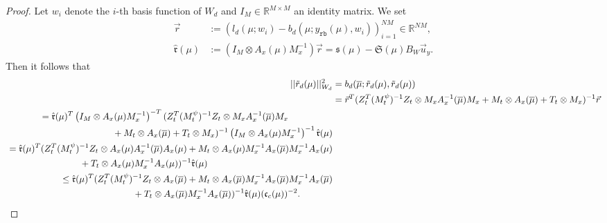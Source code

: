 \documentclass{article}
\theoremstyle{plain}
\theoremstyle{definition}
\theoremstyle{remark}
\newcommand{\RR}{\mathbb{R}}
\begin{document}
\begin{proof}
Let $w_i$ denote the $i$-th basis function of $W_d$ and $I_{M} \in \RR^{M \times M}$ an identity matrix. We set 
\begin{align}
    \Vec{r} &:= \left(l_d(\mu; w_{i}) - b_d(\mu; y_{\texttt{rb}}(\mu), w_{i})\right)_{i = 1}^{NM} \in \RR^{NM},\\
    \hat{\mathfrak{r}}(\mu) &:= \left(I_{M} \otimes A_{x}(\mu)M_{x}^{-1}\right)\Vec{r} = \mathfrak{s}(\mu) - \mathfrak{S}(\mu) B_W \Vec{u}_y.\label{eq:residual_vec_to_assemble}
\end{align}
Then it follows that
\begin{align}
    \vert \vert \Tilde{r}_{d}(\mu) \vert \vert^{2}_{W_{d}} &= b_d(\overline{\mu}; \Tilde{r}_{d}(\mu), \Tilde{r}_{d}(\mu))\\
    &= \Vec{r}^T (Z_t^T (M_t^\psi)^{-1} Z_t \otimes M_{x}A_{x}^{-1}(\overline{\mu})M_{x} + M_{t} \otimes A_{x}(\overline{\mu}) + T_t\otimes M_x)^{-1}\Vec{r}\\
\begin{split}
    &= \hat{\mathfrak{r}}(\mu)^T \left(I_{M} \otimes A_{x}(\mu)M_{x}^{-1}\right)^{- T} (Z_t^T (M_t^\psi)^{-1} Z_t \otimes M_{x}A_{x}^{-1}(\overline{\mu})M_{x} \\&\qquad\qquad\qquad\qquad+ M_{t} \otimes A_{x}(\overline{\mu}) + T_t\otimes M_x)^{-1} \left(I_{M} \otimes A_{x}(\mu)M_{x}^{-1}\right)^{-1} \hat{\mathfrak{r}}(\mu) 
\end{split}
    \\
\begin{split}
    &= \hat{\mathfrak{r}}(\mu)^T (Z_t^T (M_t^\psi)^{-1} Z_t \otimes A_{x}(\mu) A_{x}^{-1}(\overline{\mu}) A_{x}(\mu) + M_{t} \otimes A_{x}(\mu) M_{x}^{-1} A_{x}(\overline{\mu}) M_{x}^{-1} A_{x}(\mu) \\&\qquad\qquad\qquad\qquad+ T_t \otimes A_x(\mu)M_x^{-1}A_x(\mu))^{-1}\hat{\mathfrak{r}}(\mu)
\end{split} 
    \\
\begin{split}\label{eq:estmofrieszresid}
    &\leq \hat{\mathfrak{r}}(\mu)^T (Z_t^T (M_t^\psi)^{-1} Z_t \otimes A_{x}(\overline{\mu}) + M_{t} \otimes A_{x}(\overline{\mu}) M_{x}^{-1} A_{x}(\overline{\mu}) M_{x}^{-1} A_{x}(\overline{\mu}) \\&\qquad\qquad\qquad\qquad+ T_t \otimes A_x(\overline{\mu})M_x^{-1}A_x(\overline{\mu}))^{-1}\hat{\mathfrak{r}}(\mu) (\mathfrak{c}_c(\mu))^{-2}.
\end{split} 
\end{align}

\end{proof}
\end{document}
